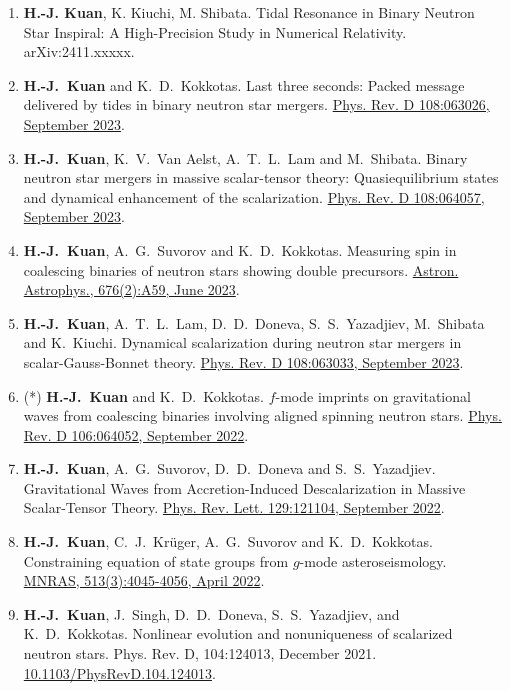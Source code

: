 \documentclass[10pt,floatfix,a4paper]{article}
\begin{document}
\begin{enumerate}
	\item \textbf{H.-J. Kuan}, K. Kiuchi, M. Shibata. Tidal Resonance in Binary Neutron Star Inspiral: A High-Precision Study in Numerical Relativity. arXiv:2411.xxxxx.
	\item \textbf{H.-J.~Kuan} and K.~D.~Kokkotas. Last three seconds: Packed message delivered by tides in binary neutron star mergers. \href{https://journals.aps.org/prd/abstract/10.1103/PhysRevD.108.063026}{Phys. Rev. D 108:063026, September 2023}. 
	\item \textbf{H.-J.~Kuan}, K.~V.~Van Aelst, A.~T.~L.~Lam and M.~Shibata. Binary neutron star mergers in massive scalar-tensor theory: Quasiequilibrium states and dynamical enhancement of the scalarization. \href{https://journals.aps.org/prd/abstract/10.1103/PhysRevD.108.064057}{Phys. Rev. D 108:064057, September 2023}.
	\item \textbf{H.-J.~Kuan}, A.~G.~Suvorov and K.~D.~Kokkotas. Measuring spin in coalescing binaries of neutron stars showing double precursors. \href{	https://doi.org/10.1051/0004-6361/202346658}{Astron. Astrophys., 676(2):A59, June 2023}.
	\item \textbf{H.-J.~Kuan}, A.~T.~L.~Lam, D.~D.~Doneva, S.~S.~Yazadjiev, M.~Shibata and K.~Kiuchi. Dynamical scalarization during neutron star mergers in scalar-Gauss-Bonnet theory. \href{https://journals.aps.org/prd/abstract/10.1103/PhysRevD.108.063033}{Phys. Rev. D 108:063033, September 2023}.
	\item (*) \textbf{H.-J.~Kuan} and K.~D.~Kokkotas. $f$-mode imprints on gravitational waves from coalescing binaries involving aligned spinning neutron stars. \href{https://journals.aps.org/prd/abstract/10.1103/PhysRevD.106.064052}{Phys. Rev. D 106:064052, September 2022}.
	\item \textbf{H.-J.~Kuan}, A.~G.~Suvorov, D.~D.~Doneva and S.~S.~Yazadjiev. Gravitational Waves from Accretion-Induced Descalarization in Massive Scalar-Tensor Theory. \href{https://journals.aps.org/prl/abstract/10.1103/PhysRevLett.129.121104}{Phys. Rev. Lett. 129:121104, September 2022}.
	\item \textbf{H.-J.~Kuan}, C.~J.~Kr{\"u}ger, A.~G.~Suvorov and K.~D.~Kokkotas. Constraining equation of state groups from $g$-mode asteroseismology. \href{https://doi.org/10.1093/mnras/stac1101}{MNRAS, 513(3):4045-4056, April 2022}.
	\item \textbf{H.-J.~Kuan}, J.~Singh, D.~D.~Doneva, S.~S.~Yazadjiev, and K.~D.~Kokkotas. Nonlinear evolution and nonuniqueness of scalarized neutron stars. Phys. Rev. D, 104:124013, December 2021. \href{https://doi.org/10.1103/PhysRevD.104.124013}{10.1103/PhysRevD.104.124013}.

\end{enumerate}
\end{document}
